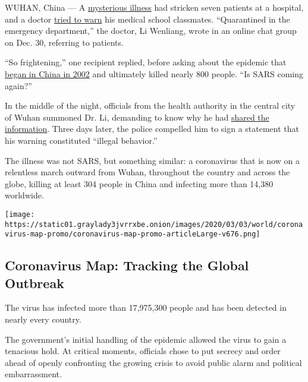 WUHAN, China --- A
\href{https://www.nytimes3xbfgragh.onion/2020/02/01/world/asia/coronavirus-china.html}{mysterious
illness} had stricken seven patients at a hospital, and a doctor
\href{https://www.nytimes3xbfgragh.onion/2020/01/27/world/asia/27china-coronavirus-health.html}{tried
to warn} his medical school classmates. ``Quarantined in the emergency
department,'' the doctor, Li Wenliang, wrote in an online chat group on
Dec. 30, referring to patients.

``So frightening,'' one recipient replied, before asking about the
epidemic that
\href{https://www.nytimes3xbfgragh.onion/2003/04/27/world/the-sars-epidemic-the-path-from-china-s-provinces-a-crafty-germ-breaks-out.html}{began
in China in 2002} and ultimately killed nearly 800 people. ``Is SARS
coming again?''

In the middle of the night, officials from the health authority in the
central city of Wuhan summoned Dr. Li, demanding to know why he had
\href{https://www.nytimes3xbfgragh.onion/2020/01/27/technology/china-coronavirus-censorship-social-media.html}{shared
the information}. Three days later, the police compelled him to sign a
statement that his warning constituted ``illegal behavior.''

The illness was not SARS, but something similar: a coronavirus that is
now on a relentless march outward from Wuhan, throughout the country and
across the globe, killing at least 304 people in China and infecting
more than 14,380 worldwide.

\href{https://www.nytimes3xbfgragh.onion/interactive/2020/world/coronavirus-maps.html}{}

\texttt{[image: https://static01.graylady3jvrrxbe.onion/images/2020/03/03/world/coronavirus-map-promo/coronavirus-map-promo-articleLarge-v676.png]}

\hypertarget{coronavirus-map-tracking-the-global-outbreak}{%
\subsection{Coronavirus Map: Tracking the Global
Outbreak}\label{coronavirus-map-tracking-the-global-outbreak}}

The virus has infected more than 17,975,300 people and has been detected
in nearly every country.

The government's initial handling of the epidemic allowed the virus to
gain a tenacious hold. At critical moments, officials chose to put
secrecy and order ahead of openly confronting the growing crisis to
avoid public alarm and political embarrassment.

